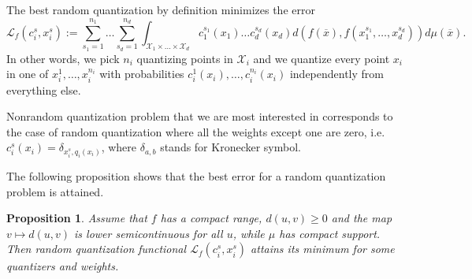 \documentclass{amsart}
\newtheorem{proposition}[theorem]{Proposition}
\theoremstyle{remark}
\numberwithin{equation}{section}
\numberwithin{figure}{section}
\def\mX{\mathcal{X}}
\def\v{\overline}
\begin{document}
The best random quantization by definition minimizes the error
\[
\mathcal{L}_f(c_i^s, x_i^s) := \sum_{s_1 = 1}^{n_1} \ldots \sum_{s_d = 1}^{n_d} \int_{\mX_1 \times\ldots \times \mX_d} c_1^{s_1}(x_1)\ldots c_d^{s_d}(x_d) d(f(\v x), f(x_1^{s_1}, \ldots, x_d^{s_d})) d\mu(\v x).
\]
In other words, we pick $n_i$ quantizing points in $\mX_i$ and we quantize every point $x_i$ in one of $x_i^1, \ldots, x_i^{n_i}$ with probabilities $c_i^1(x_i), \ldots, c_i^{n_i}(x_i)$ independently from everything else. 


Nonrandom quantization problem that we are most interested in corresponds to the case of random quantization where all the weights except one are zero, i.e. $c_i^s(x_i) = \delta_{x_i^s, q_i(x_i)}$, where $\delta_{a, b}$ stands for Kronecker symbol.

The following proposition shows that the best error for a random quantization problem is attained.

\begin{proposition}
	\label{prop:random_quant}
	Assume that $f$ has a compact range, $d(u, v) \geq 0$ and the map $v\mapsto d(u,v)$ is lower semicontinuous for all $u$, while $\mu$ has  compact support. Then random quantization functional $\mathcal{L}_f(c_i^s, x_i^s) $ attains its minimum for some quantizers and weights.
\end{proposition}	
\end{document}
